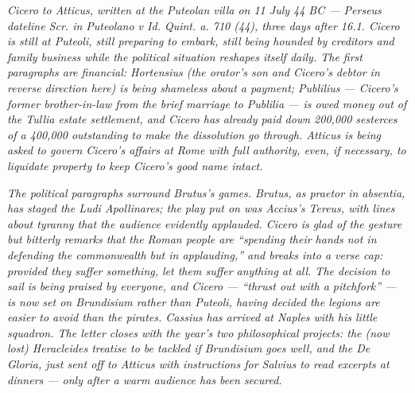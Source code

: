 
\textit{Cicero to Atticus, written at the Puteolan villa on
11 July 44 BC --- Perseus dateline \textit{Scr. in Puteolano
v Id. Quint. a. 710 (44)}, three days after 16.1. Cicero is
still at Puteoli, still preparing to embark, still being
hounded by creditors and family business while the political
situation reshapes itself daily. The first paragraphs are
financial: Hortensius (the orator's son and Cicero's debtor in
reverse direction here) is being shameless about a payment;
Publilius --- Cicero's former brother-in-law from the brief
marriage to Publilia --- is owed money out of the Tullia estate
settlement, and Cicero has already paid down 200{,}000
sesterces of a 400{,}000 outstanding to make the dissolution go
through. Atticus is being asked to govern Cicero's affairs at
Rome with full authority, even, if necessary, to liquidate
property to keep Cicero's good name intact.}

\textit{The political paragraphs surround Brutus's games. Brutus,
as praetor in absentia, has staged the Ludi Apollinares; the
play put on was Accius's \textit{Tereus}, with lines about
tyranny that the audience evidently applauded. Cicero is glad
of the gesture but bitterly remarks that the Roman people are
``spending their hands not in defending the commonwealth but in
applauding,'' and breaks into a verse cap: \textit{provided
they suffer something, let them suffer anything at all}. The
decision to sail is being praised by everyone, and Cicero ---
``thrust out with a pitchfork'' --- is now set on Brundisium
rather than Puteoli, having decided the legions are easier to
avoid than the pirates. Cassius has arrived at Naples with his
little squadron. The letter closes with the year's two
philosophical projects: the (now lost) \textit{Heracleides}
treatise to be tackled if Brundisium goes well, and the
\textit{De Gloria}, just sent off to Atticus with instructions
for Salvius to read excerpts at dinners --- only after a warm
audience has been secured.}
